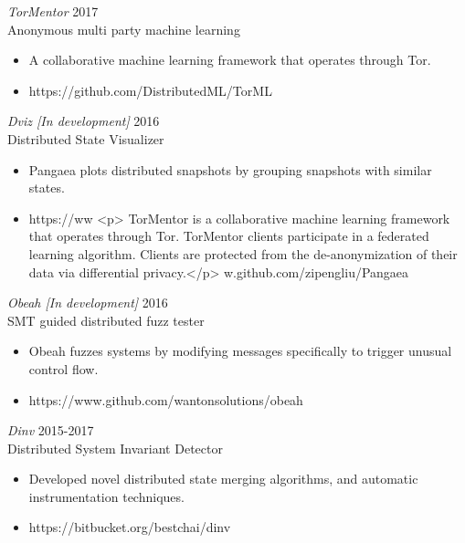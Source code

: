 \documentclass[line,margin]{res}
\begin{document}
\begin{resume}
{\sl TorMentor} \hfill 2017\\
    Anonymous multi party machine learning
\begin{itemize} \itemsep -2pt
        \item A collaborative machine learning framework that operates through Tor.
        \item https://github.com/DistributedML/TorML
\end{itemize}

{\sl Dviz [In development]} \hfill 2016\\
    Distributed State Visualizer
\begin{itemize} \itemsep -2pt
        \item Pangaea plots distributed snapshots by grouping snapshots with similar states.
        \item https://ww            <p> TorMentor is a collaborative machine learning framework that operates through Tor. TorMentor clients participate in a federated learning algorithm. Clients are protected from the de-anonymization of their data via differential privacy.</p>
w.github.com/zipengliu/Pangaea
\end{itemize}

    {\sl Obeah [In development]} \hfill 2016\\
    SMT guided distributed fuzz tester
\begin{itemize} \itemsep -2pt
        \item Obeah fuzzes systems by modifying messages specifically to trigger unusual control flow.
        \item https://www.github.com/wantonsolutions/obeah
\end{itemize}

{\sl Dinv} \hfill 2015-2017\\
    Distributed System Invariant Detector
\begin{itemize} \itemsep -2pt
        \item Developed novel distributed state merging algorithms, and automatic instrumentation techniques.
        \item https://bitbucket.org/bestchai/dinv
\end{itemize}


\end{resume}
\end{document}
